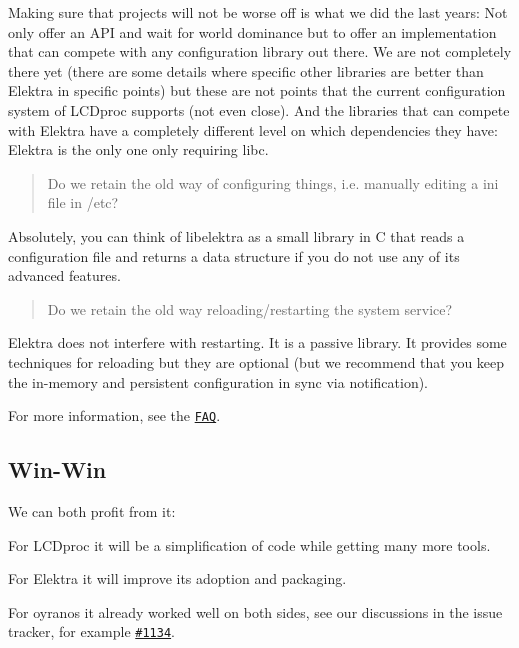 Making sure that projects will not be worse off is what we did the last years\+: Not only offer an A\+PI and wait for world dominance but to offer an implementation that can compete with any configuration library out there. We are not completely there yet (there are some details where specific other libraries are better than Elektra in specific points) but these are not points that the current configuration system of L\+C\+Dproc supports (not even close). And the libraries that can compete with Elektra have a completely different level on which dependencies they have\+: Elektra is the only one only requiring libc.

\begin{quote}
Do we retain the old way of configuring things, i.\+e. manually editing a ini file in /etc? \end{quote}


Absolutely, you can think of libelektra as a small library in C that reads a configuration file and returns a data structure if you do not use any of its advanced features.

\begin{quote}
Do we retain the old way reloading/restarting the system service? \end{quote}


Elektra does not interfere with restarting. It is a passive library. It provides some techniques for reloading but they are optional (but we recommend that you keep the in-\/memory and persistent configuration in sync via notification).

For more information, see the \href{https://www.libelektra.org/manpages/elektra-faq}{\tt F\+AQ}.

\subsection*{Win-\/\+Win}

We can both profit from it\+:


\begin{DoxyEnumerate}
\item For L\+C\+Dproc it will be a simplification of code while getting many more tools.
\item For Elektra it will improve its adoption and packaging.
\end{DoxyEnumerate}

For oyranos it already worked well on both sides, see our discussions in the issue tracker, for example \href{https://issues.libelektra.org/1134}{\tt \#1134}.

